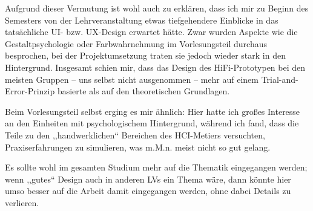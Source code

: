 \documentclass[a4paper,10pt]{scrartcl}
\begin{document}
Aufgrund dieser Vermutung ist wohl auch zu erklären, dass ich mir zu Beginn des Semesters von der Lehrveranstaltung etwas tiefgehendere Einblicke in das tatsächliche UI- bzw. UX-Design erwartet hätte. Zwar wurden Aspekte wie die Gestaltpsychologie oder Farbwahrnehmung im Vorlesungsteil durchaus besprochen, bei der Projektumsetzung traten sie jedoch wieder stark in den Hintergrund. Insgesamt schien mir, dass das Design des HiFi-Prototypen bei den meisten Gruppen -- uns selbst nicht ausgenommen -- mehr auf einem Trial-and-Error-Prinzip basierte als auf den theoretischen Grundlagen.

Beim Vorlesungsteil selbst erging es mir ähnlich: Hier hatte ich großes Interesse an den Einheiten mit psychologischem Hintergrund, während ich fand, dass die Teile zu den ,,handwerklichen`` Bereichen des HCI-Metiers versuchten, Praxiserfahrungen zu simulieren, was m.M.n. meist nicht so gut gelang.

Es sollte wohl im gesamten Studium mehr auf die Thematik eingegangen werden; wenn ,,gutes`` Design auch in anderen LVs ein Thema wäre, dann könnte hier umso besser auf die Arbeit damit eingegangen werden, ohne dabei Details zu verlieren.
\end{document}
